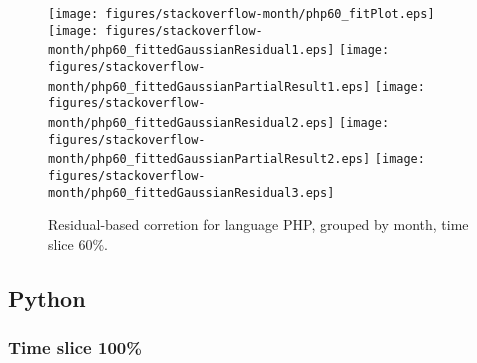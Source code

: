 \begin{figure}[t]
\centering
{}
{\texttt{[image: figures/stackoverflow-month/php60\_fitPlot.eps]}}
{\texttt{[image: figures/stackoverflow-month/php60\_fittedGaussianResidual1.eps]}}
{\texttt{[image: figures/stackoverflow-month/php60\_fittedGaussianPartialResult1.eps]}}
{\texttt{[image: figures/stackoverflow-month/php60\_fittedGaussianResidual2.eps]}}
{\texttt{[image: figures/stackoverflow-month/php60\_fittedGaussianPartialResult2.eps]}}
{\texttt{[image: figures/stackoverflow-month/php60\_fittedGaussianResidual3.eps]}}
\caption{Residual-based corretion for language PHP, grouped by month, time slice 60\%.}
\end{figure}


\FloatBarrier


\subsection{Python}

\subsubsection{Time slice 100\%}

